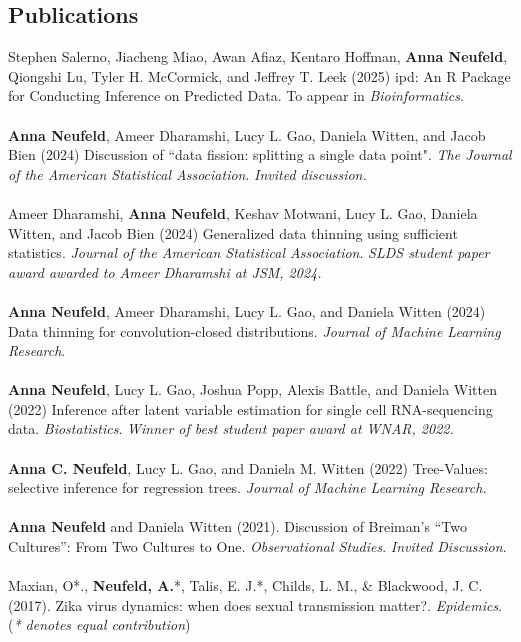 \documentclass[margin, 10pt]{res}
\begin{document}
\begin{resume}
\section{Publications} 
Stephen Salerno, Jiacheng Miao, Awan Afiaz, Kentaro Hoffman, \textbf{Anna Neufeld}, Qiongshi Lu, Tyler H. McCormick, and Jeffrey T. Leek (2025) ipd: An R Package for Conducting Inference on Predicted Data. To appear in \emph{Bioinformatics}. \\
\\
\textbf{Anna Neufeld}, Ameer Dharamshi, Lucy L. Gao, Daniela Witten, and Jacob Bien (2024) Discussion of ``data fission: splitting a single data point". \emph{The Journal of the American Statistical Association}. \emph{Invited discussion.}  \\
\\
Ameer Dharamshi, \textbf{Anna Neufeld}, Keshav Motwani, Lucy L. Gao, Daniela Witten, and Jacob Bien (2024) Generalized data thinning using sufficient statistics. \emph{Journal of the American Statistical Association}. \emph{SLDS student paper award awarded to Ameer Dharamshi at JSM, 2024.}  \\
\\
\textbf{Anna Neufeld}, Ameer Dharamshi, Lucy L. Gao, and Daniela Witten (2024) Data thinning for convolution-closed distributions. \emph{Journal of Machine Learning Research}. \\
\\
\textbf{Anna Neufeld}, Lucy L. Gao, Joshua Popp, Alexis Battle, and Daniela Witten (2022) Inference after latent variable estimation for single cell RNA-sequencing data. \emph{Biostatistics}. \emph{Winner of best student paper award at WNAR, 2022.}  \\
\\
\textbf{Anna C. Neufeld}, Lucy L. Gao, and Daniela M. Witten (2022) Tree-Values: selective inference for regression trees. \emph{Journal of Machine Learning Research.}\\
\\
\textbf{Anna Neufeld} and Daniela Witten (2021). Discussion of Breiman’s “Two Cultures”: From Two Cultures to One. \emph{Observational Studies}. \emph{Invited Discussion}.   \\
\\
Maxian, O*., \textbf{Neufeld, A.}*, Talis, E. J.*, Childs, L. M., \& Blackwood, J. C. (2017). Zika virus dynamics: when does sexual transmission matter?. \emph{Epidemics}. \\
\small
(\emph{* denotes equal contribution})
\normalsize


\end{resume}
\end{document}
